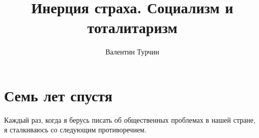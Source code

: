 \documentclass{book}
\begin{document}
\pagestyle{empty}
\title{\textbf{Инерция страха. Социализм и тоталитаризм}}
\author{Валентин Турчин}



\maketitle


\thispagestyle{empty}
\newpage




\pagestyle{fancy}
\fancyhf{}
\lhead[]{\thepage}
\rhead[\thepage]{}


\doublespacing



\chapter*{Семь лет спустя}
Каждый раз, когда я берусь писать об общественных проблемах в нашей стране, я сталкиваюсь со следующим противоречием.
\end{document}
